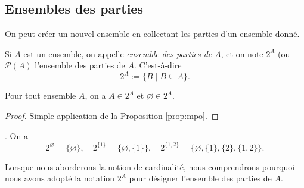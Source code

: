 \documentclass[french,course,oneside,theoremnosection]{lecture}
\begin{document}
\subsection{Ensembles des parties}
On peut créer un nouvel ensemble en collectant les parties d'un ensemble donné.

\begin{definition}
Si $A$ est un ensemble, on appelle \emph{ensemble des parties de $A$}, et on note $2^A$ (ou $\mathcal{P}(A)$ l'ensemble des parties de $A$. C'est-à-dire
\[
2^A:=\{B \mid B \subseteq A\}.
\]
\end{definition}

\begin{proposition}
Pour tout ensemble $A$, on a $A\in 2^A$ et $\varnothing \in 2^A$.
\end{proposition}
\begin{proof}
Simple application de la Proposition \ref{prop:mpo}.
\end{proof}
\begin{example}.
On a
\[
2^\varnothing  = \{\varnothing\}, \quad
2^{\{1\}}  = \{\varnothing, \{1\}\}, \quad
2^{\{1,2\}}  = \{\varnothing, \{1\}, \{2\}, \{1,2\}\}.
\]
\end{example}
Lorsque nous aborderons la notion de cardinalité, nous comprendrons pourquoi nous avons adopté la notation $2^A$ pour désigner l'ensemble des parties de $A$.
\end{document}
